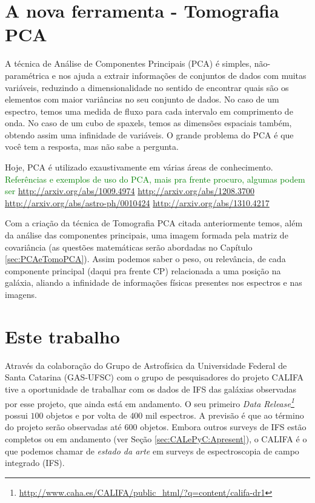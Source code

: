 \section{A nova ferramenta - Tomografia PCA}
\label{sec:Intro:TomoPCA}

A técnica de Análise de Componentes Principais (PCA) é simples, não-paramétrica
e nos ajuda a extrair informações de conjuntos de dados com muitas variáveis,
reduzindo a dimensionalidade no sentido de encontrar quais são os elementos com
maior variâncias no seu conjunto de dados. No caso de um espectro, temos uma
medida de fluxo para cada intervalo em comprimento de onda. No caso de um cubo
de spaxels, temos as dimensões espaciais também, obtendo assim uma infinidade de
variáveis. O grande problema do PCA é que você tem a resposta, mas não sabe a
pergunta.

Hoje, PCA é utilizado exaustivamente em várias áreas de conhecimento. \ojo
\citneed \textcolor{green}{Referências e exemplos de uso do PCA, mais pra
frente procuro, algumas podem ser 
\url{http://arxiv.org/abs/1009.4974}
\url{http://arxiv.org/abs/1208.3700}
\url{http://arxiv.org/abs/astro-ph/0010424}
\url{http://arxiv.org/abs/1310.4217}}

Com a criação da técnica de Tomografia PCA citada anteriormente temos, além da
análise das componentes principais, uma imagem formada pela matriz de
covariância (as questões matemáticas serão abordadas no
Capítulo \ref{sec:PCAeTomoPCA}). Assim podemos saber o peso, ou relevância, de
cada componente principal (daqui pra frente CP) relacionada a uma posição na
galáxia, aliando a infinidade de informações físicas presentes nos espectros e
nas imagens.

\section{Este trabalho}
\label{sec:Intro:ThisWork}

Através da colaboração do Grupo de Astrofísica da Universidade Federal de Santa
Catarina (GAS-UFSC) com o grupo de pesquisadores do projeto CALIFA tive a
oportunidade de trabalhar com os dados de IFS das galáxias observadas por esse
projeto, que ainda está em andamento. O seu primeiro {\em Data
Release\footnote{\url{http://www.caha.es/CALIFA/public_html/?q=content/califa-dr1}}}
\citep[][DR1]{Husemann2013} possui $100$ objetos e por volta de $400$ mil
espectros.
A previsão é que ao término do projeto serão observadas até $600$ objetos. Embora
outros surveys de IFS estão completos ou em andamento (ver Seção
\ref{sec:CALePyC:Apresent}), o CALIFA é o que podemos chamar de {\em estado da
arte} em surveys de espectroscopia de campo integrado (IFS).

